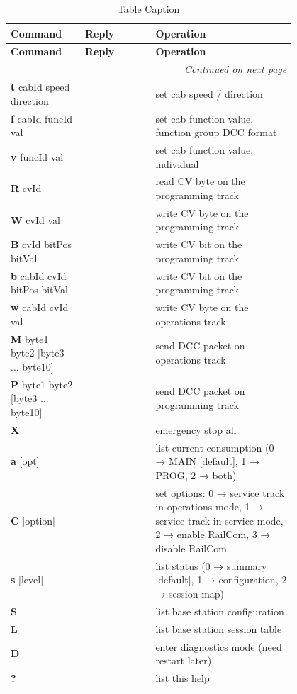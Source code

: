 \begin{longtable}{@{}|p{0.2\linewidth}|p{0.2\linewidth}|p{0.4\linewidth}|@{}}
    \caption{Table Caption} \\
    \toprule
    \textbf{Command} & \textbf{Reply} & \textbf{Operation} \\
    \midrule
    \endfirsthead
    \toprule
    \textbf{Command} & \textbf{Reply} & \textbf{Operation} \\
    \midrule
    \endhead
    \midrule
    \multicolumn{3}{r}{\textit{Continued on next page}} \\
    \midrule
    \endfoot
    \bottomrule
    \endlastfoot
    \textbf{t} cabId speed direction & & set cab speed / direction \\
    \midrule
    \textbf{f} cabId funcId val & & set cab function value, function group DCC format \\
    \midrule
    \textbf{v} funcId val & & set cab function value, individual \\
    \midrule
    \textbf{R} cvId & & read CV byte on the programming track \\
    \midrule
    \textbf{W} cvId val & & write CV byte on the programming track \\
    \midrule
    \textbf{B} cvId bitPos bitVal & & write CV bit on the programming track \\
    \midrule
    \textbf{b} cabId cvId bitPos bitVal & & write CV bit on the programming track \\
    \midrule
    \textbf{w} cabId cvId val & & write CV byte on the operations track \\
    \midrule
    \textbf{M} byte1 byte2 [byte3 ... byte10] & & send DCC packet on operations track \\
    \midrule
    \textbf{P} byte1 byte2 [byte3 ... byte10] & & send DCC packet on programming track \\
    \midrule
    \textbf{X} & & emergency stop all \\
    \midrule
    \textbf{a} [opt] & & list current consumption (0 → MAIN [default], 1 → PROG, 2 → both) \\
    \midrule
    \textbf{C} [option] & & set options: 0 → service track in operations mode, 1 → service track in service mode, 2 → enable RailCom, 3 → disable RailCom \\
    \midrule
    \textbf{s} [level] & & list status (0 → summary [default], 1 → configuration, 2 → session map) \\
    \midrule
    \textbf{S} & & list base station configuration \\
    \midrule
    \textbf{L} & & list base station session table \\
    \midrule
    \textbf{D} & & enter diagnostics mode (need restart later) \\
    \midrule
    \textbf{?} & & list this help \\
\end{longtable}

